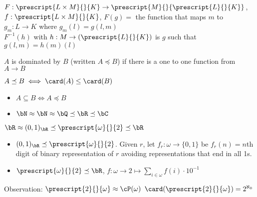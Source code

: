\begin{pf}
    $F: \prescript{L \times M}{}{K} \to \prescript{M}{}{\prescript{L}{}{K}}$, $f: \prescript{L \times M}{}{K}$, $F(g)=$ the function that maps $m$ to $g_m: L \to K$ where $g_m(l) = g(l,m)$ \\
    $F^{-1}(h)$ with $h: M \to (\prescript{L}{}{K})$ is $g$ such that $g(l,m) = h(m)(l)$
\end{pf}

\begin{definition}
    $A$ is dominated by $B$ (written $A \preceq B$) if there is a one to one function from $A \to B$
\end{definition}

\noindent
$A \preceq B \iff \card(A) \le \card(B)$ 

\begin{example}
    \begin{itemize}
        \item $A \subseteq B \iff A \preceq B$ 
        \item $\bN \approx \bN \approx \bQ \preceq \bR \preceq \bC$ 
    \end{itemize}
\end{example}

\begin{example}
    $\bR \approx (0,1)_{\bR} \preceq \prescript{\omega}{}{2} \preceq \bR$ 
    \begin{itemize}
        \item $(0,1)_{\bR} \preceq \prescript{\omega}{}{2}$. Given $r$, let $f_r: \omega \to \{0,1\}$ be $f_r(n)=n$th digit of binary representation of $r$ avoiding representations that end in all 1s. 
        \item $\prescript{\omega}{}{2} \preceq \bR$, $f: \omega \to 2 \mapsto \sum_{i \in \omega}f(i) \cdot 10^{-1}$ 
    \end{itemize}
\end{example}

\noindent
Observation: $\prescript{2}{}{\omega} \approx \cP(\omega)$ $\card(\prescript{2}{}{\omega} ) = 2^{\aleph_0}$ 